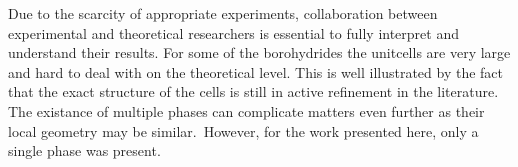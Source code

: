 Due to the scarcity of appropriate experiments, collaboration between experimental and theoretical researchers is essential to fully interpret and understand their results.
For some of the borohydrides the unitcells are very large and hard to deal with on the theoretical level.
This is well illustrated by the fact that the exact structure of the cells is still in active refinement in the literature.~\cite{cabh42-structure-p42m, cabh42-structure-p4}
The existance of multiple phases can complicate matters even further as their local geometry may be similar.~
However, for the work presented here, only a single phase was present.



